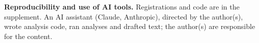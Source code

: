 \textbf{Reproducibility and use of AI tools.} Registrations and code are in the
supplement. An AI assistant (Claude, Anthropic), directed by the author(s), wrote
analysis code, ran analyses and drafted text; the author(s) are responsible for the content.



